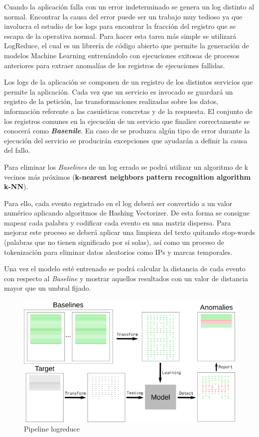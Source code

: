 Cuando la aplicación falla con un error indeterminado se genera un log distinto al normal. Encontrar la causa del error puede ser un trabajo muy tedioso ya que involucra el estudio de los logs para encontrar la fracción del registro que se escapa de la operativa normal. Para hacer esta tarea más simple se utilizará LogReduce, el cual es un librería de código abierto que permite la generación de modelos Machine Learning entrenándolo con ejecuciones exitosas de procesos anteriores para extraer anomalías de los registros de ejecuciones fallidas.

Los logs de la aplicación se componen de un registro de los distintos servicios que permite la aplicación. Cada vez que un servicio es invocado se guardará un registro de la petición, las transformaciones realizadas sobre los datos, información referente a las casuísticas concretas y de la respuesta. El conjunto de los registros comunes en la ejecución de un servicio que finalice correctamente se conocerá como \textbf{\textit{Basenile}}.  En caso de se produzca algún tipo de error durante la ejecución del servicio se producirán excepciones que ayudarán a definir la causa del fallo.


Para eliminar los \textit{Baselines} de un log errado se podrá utilizar un algoritmo de k vecinos más próximos (\textbf{k-nearest neighbors pattern recognition algorithm k-NN}). 

Para ello, cada evento registrado en el log deberá ser convertido a un valor numérico aplicando algoritmos de Hashing Vectorizer. De esta forma se consigue mapear cada palabra y codificar cada evento en una matriz dispersa. Para mejorar este proceso se deberá aplicar una limpieza del texto quitando stop-words (palabras que no tienen significado por si solas), así como un proceso de tokenización para eliminar datos aleatorios como IPs y marcas temporales.

Una vez el modelo esté entrenado se podrá calcular la distancia de cada evento con respecto al \textit{Baseline} y mostrar aquellos resultados con un valor de distancia mayor que un umbral fijado. 

\begin{figure}[H]
\centerline{\includegraphics[width=15cm]{figuras/logreduce.png}}
\caption{Pipeline logreduce}
\label{enlace1}
\end{figure}

